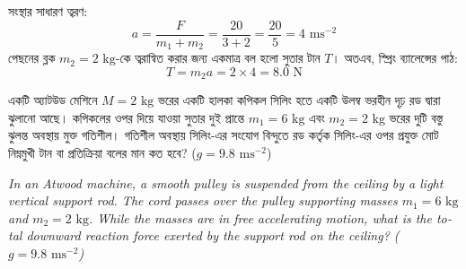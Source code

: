 \documentclass[12pt, a4paper]{article}
\begin{document}
\begin{tcolorbox}[solutionbox={সমাধান (Solution)}]
\noindent
সংস্থার সাধারণ ত্বরণ:
\[ a = \frac{F}{m_1 + m_2} = \frac{20}{3 + 2} = \frac{20}{5} = 4\text{ ms}^{-2} \]
পেছনের ব্লক $m_2 = 2\text{ kg}$-কে ত্বরান্বিত করার জন্য একমাত্র বল হলো সুতার টান $T$। 
অতএব, স্প্রিং ব্যালেন্সের পাঠ:
\[ T = m_2 a = 2 \times 4 = 8.0\text{ N} \]
\end{tcolorbox}

\newpage

\begin{tcolorbox}[questionbox={প্রশ্ন (Question) 15}]
\noindent
একটি অ্যাটউড মেশিনে $M = 2\text{ kg}$ ভরের একটি হালকা কপিকল সিলিং হতে একটি উলম্ব ভরহীন দৃঢ় রড দ্বারা ঝুলানো আছে। কপিকলের ওপর দিয়ে যাওয়া সুতার দুই প্রান্তে $m_1 = 6\text{ kg}$ এবং $m_2 = 2\text{ kg}$ ভরের দুটি বস্তু ঝুলন্ত অবস্থায় মুক্ত গতিশীল। গতিশীল অবস্থায় সিলিং-এর সংযোগ বিন্দুতে রড কর্তৃক সিলিং-এর ওপর প্রযুক্ত মোট নিম্নমুখী টান বা প্রতিক্রিয়া বলের মান কত হবে? ($g = 9.8\text{ ms}^{-2}$)

\vspace{0.8em}
\begin{english}
\noindent\textit{\color{darkgray}
In an Atwood machine, a smooth pulley is suspended from the ceiling by a light vertical support rod. The cord passes over the pulley supporting masses $m_1 = 6\text{ kg}$ and $m_2 = 2\text{ kg}$. While the masses are in free accelerating motion, what is the total downward reaction force exerted by the support rod on the ceiling? ($g = 9.8\text{ ms}^{-2}$)
}
\end{english}
\end{tcolorbox}
\end{document}
